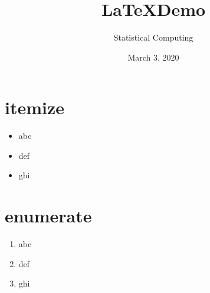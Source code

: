 \documentclass[12pt]{article}  %
\title{\LaTeX Demo}
\author{Statistical Computing}
\date{March 3, 2020}
\begin{document}
\maketitle  %

\section*{itemize}
\begin{itemize}
	\item abc
	\item def
	\item ghi
\end{itemize}

\section*{enumerate}
\begin{enumerate}[1]
	\item abc
	\item def
	\item ghi
\end{enumerate}
\end{document}
